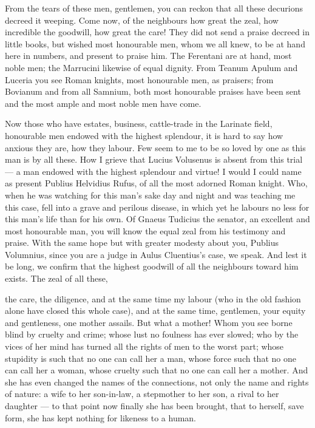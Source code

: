  From the tears of these men, gentlemen, you can reckon that all these decurions decreed it weeping. Come now, of the neighbours how great the zeal, how incredible the goodwill, how great the care! They did not send a praise decreed in little books, but wished most honourable men, whom we all knew, to be at hand here in numbers, and present to praise him. The Ferentani are at hand, most noble men; the Marrucini likewise of equal dignity. From Teanum Apulum and Luceria you see Roman knights, most honourable men, as praisers; from Bovianum and from all Samnium, both most honourable praises have been sent and the most ample and most noble men have come.

 Now those who have estates, business, cattle-trade in the Larinate field, honourable men endowed with the highest splendour, it is hard to say how anxious they are, how they labour. Few seem to me to be so loved by one as this man is by all these. How I grieve that Lucius Volusenus is absent from this trial --- a man endowed with the highest splendour and virtue! I would I could name as present Publius Helvidius Rufus, of all the most adorned Roman knight. Who, when he was watching for this man's sake day and night and was teaching me this case, fell into a grave and perilous disease, in which yet he labours no less for this man's life than for his own. Of Gnaeus Tudicius the senator, an excellent and most honourable man, you will know the equal zeal from his testimony and praise. With the same hope but with greater modesty about you, Publius Volumnius, since you are a judge in Aulus Cluentius's case, we speak. And lest it be long, we confirm that the highest goodwill of all the neighbours toward him exists. The zeal of all these,

 the care, the diligence, and at the same time my labour (who in the old fashion alone have closed this whole case), and at the same time, gentlemen, your equity and gentleness, one mother assails. But what a mother! Whom you see borne blind by cruelty and crime; whose lust no foulness has ever slowed; who by the vices of her mind has turned all the rights of men to the worst part; whose stupidity is such that no one can call her a man, whose force such that no one can call her a woman, whose cruelty such that no one can call her a mother. And she has even changed the names of the connections, not only the name and rights of nature: a wife to her son-in-law, a stepmother to her son, a rival to her daughter --- to that point now finally she has been brought, that to herself, save form, she has kept nothing for likeness to a human.

